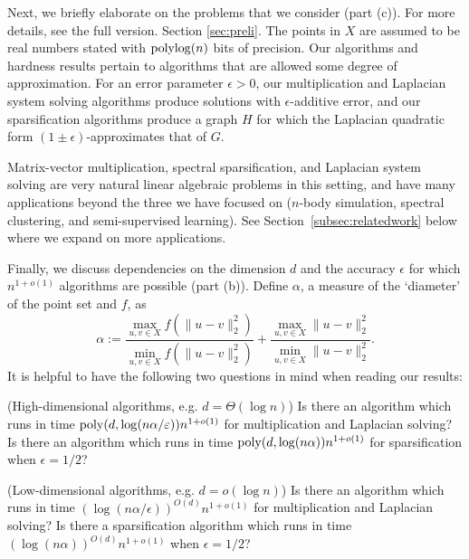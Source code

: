 Next, we briefly elaborate on the problems that we consider (part (c)). For more details, see 
\ifdefined\isfocs
the full version. 
\else
Section \ref{sec:preli}. 
\fi
The points in $X$ are assumed to be real numbers stated with $\mathrm{polylog}(n)$ bits of precision. Our algorithms and hardness results pertain to algorithms that are allowed some degree of approximation. For an error parameter $\epsilon > 0$, our multiplication and Laplacian system solving algorithms produce solutions with $\epsilon$-additive error, and our sparsification algorithms produce a graph $H$ for which the Laplacian quadratic form $(1 \pm \epsilon)$-approximates that of $G$.

Matrix-vector multiplication, spectral sparsification, and Laplacian system solving are very natural linear algebraic problems in this setting, and have many applications beyond the three we have focused on ($n$-body simulation, spectral clustering, and semi-supervised learning). See Section~\ref{subsec:relatedwork} below where we expand on more applications.

Finally, we discuss dependencies on the dimension $d$ and the accuracy $\epsilon$ for which $n^{1+o(1)}$ algorithms are possible (part (b)). Define $\alpha$, a measure of the `diameter' of the point set and $f$, as
$$\alpha := \frac{ \max_{u,v \in X} f( \| u - v \|_2^2 ) }{ \min_{u,v \in X} f( \| u - v \|_2^2 ) } + \frac{ \max_{u,v \in X}  \| u - v \|_2^2  }{ \min_{u,v \in X}  \| u - v \|_2^2  }.$$
It is helpful to have the following two questions in mind when reading our results:

\vspace{2mm}
\begin{compactitem}
\item (High-dimensional algorithms, e.g. $d = \Theta(\log n)$) Is there an algorithm which runs in time $\mathrm{poly}(d, \log(n\alpha/\varepsilon)) n^{1+o(1)}$ for multiplication and Laplacian solving? Is there an algorithm which runs in time $\mathrm{poly}(d, \log(n\alpha))n^{1+o(1)}$ for sparsification when $\epsilon=1/2$?

\item (Low-dimensional algorithms, e.g. $d = o(\log n)$) Is there an algorithm which runs in time $(\log(n\alpha/\epsilon))^{O(d)} n^{1+o(1)}$ for multiplication and Laplacian solving? Is there a sparsification algorithm which runs in time $(\log(n\alpha))^{O(d)} n^{1+o(1)}$ when $\epsilon=1/2$?
\end{compactitem}
\vspace{2mm}


